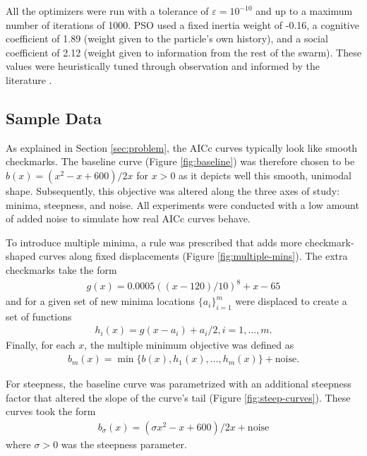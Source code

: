 \documentclass[letterpaper,12pt,twocolumn]{article}
\begin{document}
All the optimizers were run with a tolerance of $\varepsilon = 10^{-10}$ and up to a maximum number of iterations of 1000. PSO used a fixed inertia weight of -0.16, a cognitive coefficient of 1.89 (weight given to the particle's own history), and a social coefficient of 2.12 (weight given to information from the rest of the swarm). These values were heuristically tuned through observation and informed by the literature \cite{Bonyadi2017}.

\subsection{Sample Data}
As explained in Section \ref{sec:problem}, the AICc curves typically look like smooth checkmarks. The baseline curve (Figure \ref{fig:baseline}) was therefore chosen to be $b(x) = (x^2 - x + 600)/2x$ for $x > 0$ as it depicts well this smooth, unimodal shape. Subsequently, this objective was altered along the three axes of study: minima, steepness, and noise. All experiments were conducted with a low amount of added noise to simulate how real AICc curves behave.

To introduce multiple minima, a rule was prescribed that adds more checkmark-shaped curves along fixed displacements (Figure \ref{fig:multiple-mins}). The extra checkmarks take the form \begin{align*}
    g(x) = 0.0005((x-120)/10)^8 + x - 65
\end{align*} and for a given set of new minima locations $\{a_i\}_{i=1}^m$ were displaced to create a set of functions \begin{align*}
    h_i(x) = g(x - a_i) + a_i/2, i = 1, \dots, m.
\end{align*} Finally, for each $x$, the multiple minimum objective was defined as \begin{align*}
    b_m(x) = \min \{b(x), h_1(x), \dots, h_m(x)\} + \text{noise}.
\end{align*} 

For steepness, the baseline curve was parametrized with an additional steepness factor that altered the slope of the curve's tail (Figure \ref{fig:steep-curves}). These curves took the form \begin{align*}
    b_\sigma(x) = (\sigma x^2 - x + 600)/2x + \text{noise}
\end{align*} where $\sigma > 0$ was the steepness parameter.
\end{document}
